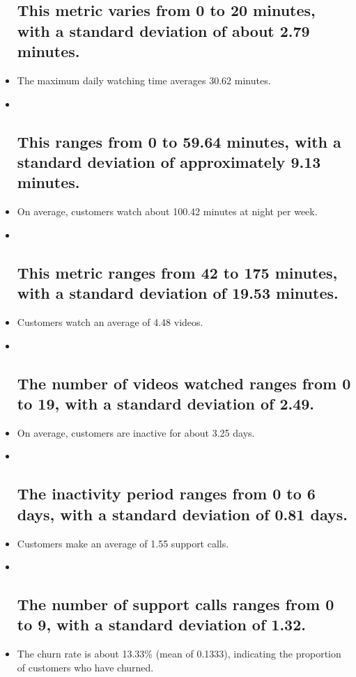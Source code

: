 \documentclass[11pt]{article}
\begin{document}
\begin{itemize}
  \subsection{This metric varies from 0 to 20 minutes, with a standard
  deviation of about 2.79
  minutes.}\label{this-metric-varies-from-0-to-20-minutes-with-a-standard-deviation-of-about-2.79-minutes.}
\item
  The maximum daily watching time averages 30.62 minutes.
\item ~
  \subsection{This ranges from 0 to 59.64 minutes, with a standard
  deviation of approximately 9.13
  minutes.}\label{this-ranges-from-0-to-59.64-minutes-with-a-standard-deviation-of-approximately-9.13-minutes.}
\item
  On average, customers watch about 100.42 minutes at night per week.
\item ~
  \subsection{This metric ranges from 42 to 175 minutes, with a standard
  deviation of 19.53
  minutes.}\label{this-metric-ranges-from-42-to-175-minutes-with-a-standard-deviation-of-19.53-minutes.}
\item
  Customers watch an average of 4.48 videos.
\item ~
  \subsection{The number of videos watched ranges from 0 to 19, with a
  standard deviation of
  2.49.}\label{the-number-of-videos-watched-ranges-from-0-to-19-with-a-standard-deviation-of-2.49.}
\item
  On average, customers are inactive for about 3.25 days.
\item ~
  \subsection{The inactivity period ranges from 0 to 6 days, with a
  standard deviation of 0.81
  days.}\label{the-inactivity-period-ranges-from-0-to-6-days-with-a-standard-deviation-of-0.81-days.}
\item
  Customers make an average of 1.55 support calls.
\item ~
  \subsection{The number of support calls ranges from 0 to 9, with a
  standard deviation of
  1.32.}\label{the-number-of-support-calls-ranges-from-0-to-9-with-a-standard-deviation-of-1.32.}
\item
  The churn rate is about 13.33\% (mean of 0.1333), indicating the
  proportion of customers who have churned.
\end{itemize}
\end{document}
